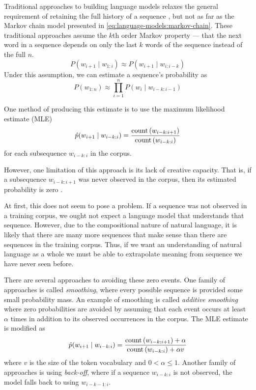 Traditional approaches to building language models relaxes the general requirement of retaining the full history of a sequence \cite{mikolov2012statistical}, but not as far as the Markov chain model presented in \autoref{eq:language-models:markov-chain}.
These traditional approaches assume the $k$th order Markov property \cite{goldberg_2017} --- that the next word in a sequence depends on only the last $k$ words of the sequence instead of the full $n$.
\begin{equation}
    P(w_{i+1} \mid w_{1:i}) \approx P(w_{i+1} \mid w_{i:i-k}) \label{eq:language-models:k-order-markov}
\end{equation}
Under this assumption, we can estimate a sequence's probability as
\begin{equation}
    P(w_{1:n}) \approx \prod_{i=1}^n P(w_i \mid w_{i-k:i-1}) \label{eq:language-models:k-order-sequence-probability}
\end{equation}

One method of producing this estimate is to use the maximum likelihood estimate (MLE)
\begin{equation}
    \hat p (w_{i+1} \mid w_{i-k:i}) = \frac{\operatorname{count}\left(w_{i-k:i+1}\right)}{\operatorname{count}\left(w_{i-k:i}\right)} \label{eq:language-models:mle}
\end{equation}
for each subsequence $w_{i-k:i}$ in the corpus.

However, one limitation of this approach is its lack of creative capacity.
That is, if a subsequence $w_{i-k:i+1}$ was never observed in the corpus, then its estimated probability is zero \cite{goldberg_2017}.

At first, this does not seem to pose a problem.
If a sequence was not observed in a training corpus, we ought not expect a language model that understands that sequence.
However, due to the compositional nature of natural language, it is likely that there are many more sequences that make sense than there are sequences in the training corpus.
Thus, if we want an understanding of natural language as a whole we must be able to extrapolate meaning from sequence we have never seen before.

There are several approaches to avoiding these zero events.
One family of approaches is called \textit{smoothing}, where every possible sequence is provided some small probability mass.
An example of smoothing is called \textit{additive smoothing} \cite{chen_goodman_1999,goodman_2001} where zero probabilities are avoided by assuming that each event occurs at least $\alpha$ times in addition to its observed occurrences in the corpus.
The MLE estimate is modified as
\begin{equation}
    \hat p (w_{i+1} \mid w_{i-k:i}) = \frac{\operatorname{count}\left(w_{i-k:i+1}\right) + \alpha}{\operatorname{count}\left(w_{i-k:i}\right) + \alpha v} \label{eq:language-models:alpha-smoothing}
\end{equation}
where $v$ is the size of the token vocabulary and $0 < \alpha \leq 1$. Another family of approaches is using \textit{back-off}, where if a sequence $w_{i-k:i}$ is not observed, the model falls back to using $w_{i-k-1:i}$\cite{chen_goodman_1999,goodman_2001,JelMer80}.

